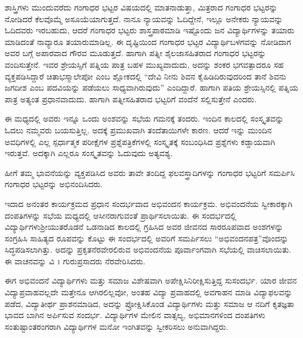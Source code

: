 {ಶಾಸ್ತ್ರಿಗಳು ಮುಂದುವರೆದು ಗಂಗಾಧರ ಭಟ್ಟರ ವಿಷಯದಲ್ಲಿ ಮಾತನಾಡುತ್ತಾ, \enginline{-} ಮಿತ್ರರಾದ ಗಂಗಾಧರ ಭಟ್ಟರನ್ನು ನೋಡಿದರೆ ಕೆಲವೊಮ್ಮೆ ಅಸೂಯೆಯಾ\-ಗುತ್ತದೆ. ನಾನೂ ನ್ಯಾಯವನ್ನು ಓದಿದ್ದೇನೆ, ಇಲ್ಲೂ ಅನೇಕರು ನ್ಯಾಯವನ್ನು ಓದಿದವರು ಇರಬಹುದು, ಆದರೆ ಗಂಗಾಧರ ಭಟ್ಟರು ಶಾಸ್ತ್ರಪಾಠಮಾಡಿ ಇಷ್ಟೊಂದು ಜನ ವಿದ್ಯಾರ್ಥಿಗಳನ್ನು ತಯಾರು ಮಾಡಿದಂತೆ ನಾವ್ಯಾರೂ ತಯಾರುಮಾಡಿಲ್ಲ. ಈ ದೃಷ್ಟಿಯಿಂದ ಗಂಗಾಧರ ಭಟ್ಟರ ವಿದ್ಯಾರ್ಥಿಬಳಗವನ್ನು ನೋಡಿದಾಗ ಅವರ ಬಗ್ಗೆ ಅಪಾರವಾದ ಗೌರವ ಮೂಡುತ್ತದೆ. ಹಾಗಾಗಿ ಪತ್ನೀ\enginline{-} ಶೈಲಜಾಸಹಿತರಾದ ಗಂಗಾಧರ ಭಟ್ಟರನ್ನು ವಂದಿಸುತ್ತೇನೆ. ಇವರ ಶ್ರೇಯಸ್ಸಿಗೆ ಪತ್ನಿಯ ಪಾತ್ರ ಬಹಳ ಮುಖ್ಯ\-ವಾದುದು, ಅದನ್ನು ಶಂಕರ ಭಗವತ್ಪಾದರೂ ಸಹ ವ್ಯಕ್ತಪಡಿಸಿದ್ದಾರೆ ಚಿತಾಭಸ್ಮಾಲೇಪೋ ಎಂಬ ಶ್ಲೋಕದಲ್ಲಿ \enginline{-} “ದೇವಿ ನೀನು ಶಿವನ ಕೈಹಿಡಿದಿರುವುದರಿಂದ ತಾನೆ ಶಿವನು ಜಗದೀಶ ಎಂಬ ಪದವಿಯನ್ನು ಪಡೆಯಲು ಸಾಧ್ಯವಾಗಿರುವುದು” ಎಂದಿದ್ದಾರೆ. ಹಾಗಾಗಿ ಪತಿಯ ಶ್ರೇಯಸ್ಸಿನಲ್ಲಿ ಪತ್ನಿಯ ಪಾತ್ರ ಅತ್ಯಂತ ಪ್ರಧಾನವಾದುದು. ಹಾಗಾಗಿ ಪತ್ನೀ\-ಸಹಿತರಾದ ಭಟ್ಟರಿಗೆ ವಂದೆನೆ ಸಲ್ಲಿಸುತ್ತೇನೆ ಎಂದರು.

ಈ ಮಧ್ಯದಲ್ಲಿ ಅವರು ಇನ್ನೂ ಒಂದು ಅಂಶವನ್ನು ಸಭೆಯ ಗಮನಕ್ಕೆ ತಂದರು. ಇಂದಿನ ಕಾಲದಲ್ಲಿ ಸಂಸ್ಕೃತವನ್ನು ಓದಲು ನಮ್ಮವರು ಬಯಸುತ್ತಿಲ್ಲ. ಅದಕ್ಕೆ ಪ್ರಮುಖವಾಗಿ ತಂದೆತಾಯಿಗಳೇ ಕಾರಣ. ಆದರೆ ಇನ್ನು ಮುಂದಿನ ಅವಧಿಗಳಲ್ಲಿ ಎಲ್ಲ ಸ್ಪರ್ಧಾತ್ಮಕ ಪರೀಕ್ಷೆಗಳ ಪ್ರಶ್ನೆಪತ್ರಿಕೆಗಳಲ್ಲಿ ಸಂಸ್ಕೃತಕ್ಕೆ ಸಂಬಂಧಿಸಿದ ಪ್ರಶ್ನೆಗಳು ಕಡ್ಡಾಯವಾಗಿ ಇರುತ್ತವೆ. ಅದಕ್ಕಾಗಿ ಎಲ್ಲರೂ ಸಂಸ್ಕೃತವನ್ನು ಓದುವುದು ಅತ್ಯವಶ್ಯ.  

ಹೀಗೆ ತಮ್ಮ ಭಾವನೆಯನ್ನು ವ್ಯಕ್ತಪಡಿಸಿದ ಅವರು ತಾವೇ ತಂದಿದ್ದ ಫಲವಸ್ತ್ರಾದಿ\-ಗಳನ್ನು ಗಂಗಾಧರ ಭಟ್ಟರಿಗೆ ಸಮರ್ಪಿಸಿ ಗಂಗಾಧರ ಭಟ್ಟರನ್ನು ಅಭಿನಂದಿಸಿದರು.

ಇದಾದ ಅನಂತರ ಕಾರ್ಯಕ್ರಮದ ಪ್ರಧಾನ ಸಂದರ್ಭವಾದ ಅಭಿವಂದನ ಕಾರ್ಯಕ್ರಮ. ಅಭಿವಂದನೆಯ ಸ್ವೀಕಾರಕ್ಕಾಗಿ ದಂಪತಿಗಳನ್ನು ಸಭೆಯ ಮಧ್ಯದಲ್ಲಿ ಆಸೀನರಾಗುವಂತೆ ಪ್ರಾರ್ಥಿಸಲಾಯಿತು. ಈ ಸಂದರ್ಭದಲ್ಲಿ ವಿದ್ಯಾರ್ಥಿಗಳು\break ಶ್ರೀಯುತ\-ರೊಡನೆ ಒಡನಾಡಿದ ಕಾಲದಲ್ಲಿ ಗ್ರಹಿಸಿದ ಅವರ ಜೀವನದ ಸಾರರೂಪವಾದ ಅಂಶಗಳನ್ನು ಸಂಗ್ರಹಿಸಿ ಸಾಹಿತ್ಯದ ರೂಪವನ್ನು ಕೊಟ್ಟು ಈ ಸಂದರ್ಭದಲ್ಲಿ ಅವರಿಗೆ ಸಮರ್ಪಿಸಲು “ಅಭಿವಂದನಪತ್ರ”ವೊಂದನ್ನು ಸಿದ್ಧಪಡಿಸಲಾಗಿತ್ತು. ಅದನ್ನು ಪ್ರಕೃತ\break ನೆರವೇರಲಿರುವ ಅಭಿವಂದನೆಯ ಪೂರ್ವಾಂಗವಾಗಿ ಸಭೆಯಲ್ಲಿ ವಾಚಿಸಲಾಯಿತು. ಈ ವಾಚನವನ್ನು ವಿ । ಗುರುಪ್ರಸಾದರು ನೆರವೇರಿಸಿದರು. 

ಈಗ ಅಭಿವಂದನೆ \enginline{-} ವಿದ್ಯಾರ್ಥಿಗಳು ಮತ್ತು ಸಮಾಜ ವಿಶೇಷವಾಗಿ ಅಪೇಕ್ಷಿಸಿ\break ನಿರೀಕ್ಷಿಸುತ್ತಿದ್ದ ಸುಸಂದರ್ಭ. ಯಾರ ಜೀವನ ವಿದ್ಯಾಪ್ರವಾಹವಲ್ಲದೇ ಮತ್ತೇನೂ ಆಗಿರ\-ಲಿಲ್ಲವೋ, ಅಂತಹ ವಿದ್ಯಾ ಪ್ರವಾಹದಲ್ಲಿ ಅವಗಾಹನ ಮಾಡಿ ವಿದ್ಯಾಫಲವನ್ನು ಪಡೆದ, ವಿದ್ಯಾತೀರ್ಥ ಪ್ರಾಶನಮಾಡಿದ, ಅದನ್ನು ಪ್ರೋಕ್ಷಿಸಿಕೊಂಡ ವಿದ್ಯಾರ್ಥಿಗಳು ಮತ್ತು ಸಮಾಜ ಆ ನದಿಗೆ ಕೃತಜ್ಞತಾ ಭಾವದ ಬಾಗಿನ ಅರ್ಪಿಸುವ ಸಂದರ್ಭ. ವಿದ್ಯಾರ್ಥಿಗಳ ಮೇಲಿನ ವಾತ್ಸಲ್ಯ, ಅಭಿಮಾನಗಳಿಂದ ದಂಪತಿಗಳು ಸಂತುಷ್ಟಾಂತರಂಗ\-ರಾಗಿ ವಿದ್ಯಾರ್ಥಿಗಳ ಮನೋ ಇಂಗಿತವನ್ನು ಸ್ವೀಕರಿಸಲು ಅನುವಾಗಿದ್ದರು. 

}

